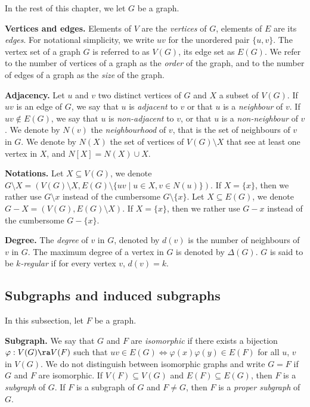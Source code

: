 \medskip

In the rest of this chapter, we let $G$ be a graph.

\medskip

\textbf{Vertices and edges.}
Elements of $V$ are the \emph{vertices} of $G$, elements of $E$ are its \emph{edges}. 
For notational simplicity, we write $uv$ for the unordered pair $\{u,v\}$.
The vertex set of a graph $G$ is referred to as $V(G)$, its edge set as $E(G)$. 
We refer to the number of vertices of a graph as the \emph{order} of the graph, and to the number of edges of a graph as the \emph{size} of the graph.

\medskip

\textbf{Adjacency.}
Let $u$ and $v$ two distinct vertices of $G$ and $X$ a subset of $V(G)$.
If $uv$ is an edge of $G$, we say that $u$ is \emph{adjacent} to $v$ or that $u$ is a \emph{neighbour} of $v$. 
If $uv \notin E(G)$, we say that $u$ is \emph{non-adjacent} to $v$, or that $u$ is a \emph{non-neighbour} of $v$. 
We denote by $N(v)$  the \emph{neighbourhood} of $v$, that is the set of neighbours of $v$ in $G$. 
We denote by $N(X)$ the set of vertices of $V(G) \setminus X$ that see at least one vertex in $X$, and $N[X]=N(X) \cup X$. 

\medskip

\textbf{Notations.}
Let $X \subseteq V(G)$, we denote $G \setminus X = (V(G) \setminus X, E(G) \setminus \{uv \mid u \in X, v \in N(u)\})$. If $X = \{x\}$, then we rather use $G \setminus x$ instead of the cumbersome $G \setminus \{x\}$.
Let $X \subseteq E(G)$, we denote $G - X = (V(G), E(G) \setminus X)$.
If $X = \{x\}$, then we rather use $G - x$ instead of the cumbersome $G - \{x\}$.

\medskip

\textbf{Degree.}
The \emph{degree} of $v$ in $G$, denoted by $d(v)$ is the number of neighbours of $v$ in $G$. The maximum degree of a vertex in $G$ is denoted by $\Delta(G)$. $G$ is said to be \emph{$k$-regular} if for every vertex $v$, $d(v)=k$.


\subsection{Subgraphs and induced subgraphs}

In this subsection, let $F$ be a graph. 

\medskip

\textbf{Subgraph.}
We say that $G$ and $F$ are \emph{isomorphic} if there exists a bijection $\varphi : V(G) \ra V(F)$ such that $uv \in E(G) \Leftrightarrow \varphi(x)\varphi(y) \in E(F)$ for all $u$, $v$ in $V(G)$.  
We do not distinguish between isomorphic graphs and write $G=F$ if $G$ and $F$ are isomorphic. 
If $V(F) \subseteq V(G)$ and $E(F) \subseteq E(G)$, then $F$  is a \emph{subgraph} of $G$. If $F$ is a subgraph of $G$ and $F \neq G$, then $F$ is a \emph{proper subgraph} of $G$.

